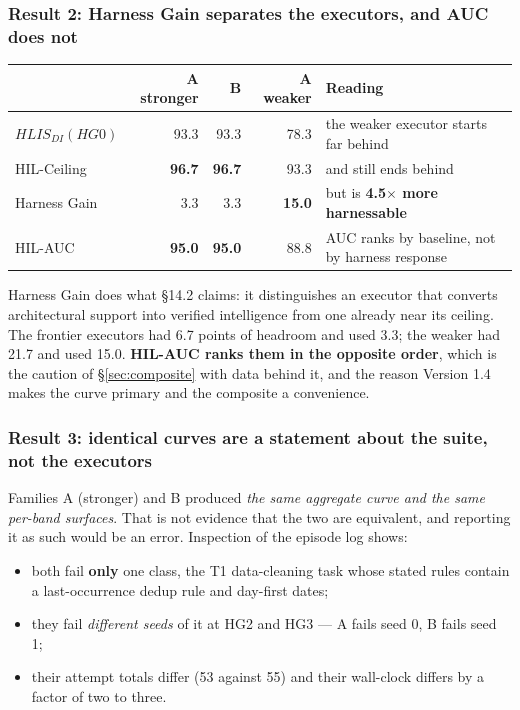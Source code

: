 \documentclass[11pt]{article}
\theoremstyle{definition}
\begin{document}
\subsubsection{Result 2: Harness Gain separates the executors, and AUC does not}

\begin{table}[h]
\centering\small
\begin{tabularx}{\textwidth}{@{}lrrrY@{}}
\toprule
& A stronger & B & A weaker & Reading \\
\midrule
$HLIS_{DI}(HG0)$ & 93.3 & 93.3 & 78.3 & the weaker executor starts far behind \\
HIL-Ceiling & \textbf{96.7} & \textbf{96.7} & 93.3 & and still ends behind \\
Harness Gain & 3.3 & 3.3 & \textbf{15.0} & but is \textbf{4.5$\times$ more harnessable} \\
HIL-AUC & \textbf{95.0} & \textbf{95.0} & 88.8 & AUC ranks by baseline, not by harness response \\
\bottomrule
\end{tabularx}
\end{table}

Harness Gain does what \S14.2 claims: it distinguishes an executor that converts architectural support into verified intelligence from one already near its ceiling. The frontier executors had 6.7 points of headroom and used 3.3; the weaker had 21.7 and used 15.0. \textbf{HIL-AUC ranks them in the opposite order}, which is the caution of \S\ref{sec:composite} with data behind it, and the reason Version 1.4 makes the curve primary and the composite a convenience.

\subsubsection{Result 3: identical curves are a statement about the suite, not the executors}

Families A (stronger) and B produced \emph{the same aggregate curve and the same per-band surfaces}. That is not evidence that the two are equivalent, and reporting it as such would be an error. Inspection of the episode log shows:

\begin{itemize}
\item both fail \textbf{only} one class, the T1 data-cleaning task whose stated rules contain a last-occurrence dedup rule and day-first dates;
\item they fail \emph{different seeds} of it at HG2 and HG3 --- A fails seed 0, B fails seed 1;
\item their attempt totals differ (53 against 55) and their wall-clock differs by a factor of two to three.
\end{itemize}
\end{document}
